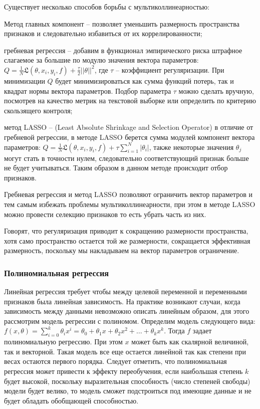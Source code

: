 Существует несколько способов борьбы с мультиколлинеарностью: 
\begin{description}[font=$\bullet$]
    \item Метод главных компонент -- позволяет уменьшить размерность пространства признаков и следовательно избавиться от их коррелированности;
    \item гребневая регрессия -- добавим в функционал эмпирического риска штрафное слагаемое за большие по модулю значения вектора параметров: $Q = \frac{1}{N} \mathfrak{L}(\theta,x_i,y_i,f) + \frac{\tau}{2}|| \theta ||^2$, где $\tau$ -- коэффициент регуляризации. При минимизации $Q$ будет минимизироваться как сумма функций потерь, так и квадрат нормы вектора параметров. Подбор параметра $\tau$ можно сделать вручную, посмотрев на качество метрик на текстовой выборке или определить по критерию скользящего контроля;
    \item метод LASSO -- (Least Absolute Shrinkage and Selection Operator) в отличие от гребневой регрессии, в методе LASSO берется сумма модулей компонент вектора параметров: $Q = \frac{1}{N} \mathfrak{L}(\theta,x_i,y_i,f) + \tau\sum\limits_{i=1}^N |\theta_i|$, также некоторые значения $\theta_j$ могут стать в точности нулем, следовательно соответствующий признак больше не будет учитываться. Таким образом в данном методе происходит отбор признаков.
\end{description}

Гребневая регрессия и метод LASSO позволяют ограничить вектор параметров и тем самым избежать проблемы мультиколлинеарности, при этом в методе LASSO можно провести селекцию признаков то есть убрать часть из них.

Говорят, что регуляризация приводит к сокращению размерности пространства, хотя само пространство остается той же размерности, сокращается эффективная размерность, поскольку мы накладываем на вектор параметров ограничение.


\subsubsection{Полиномиальная регрессия}

Линейная регрессия требует чтобы между целевой переменной и переменными признаков была линейная зависимость. На практике возникают случаи, когда зависимость между данными невозможно описать линейным образом, для этого рассмотрим модель регрессии с полиномом. Определим модель следующего вида: $f(x,\theta) = \sum\limits_{i=0}^k \theta_i x^i = \theta_0 + \theta_1 x + \theta_2 x^2 + \dots + \theta_k x^k $. Тогда $f$ задает полиномиальную регрессию. При этом $x$ может быть как скалярной величиной, так и векторной. Такая модель все еще остается линейной так как степени при весах остаются первого порядка. Следует отметить, что полиномиальная регрессия может привести к эффекту переобучения, если наибольшая степень $k$ будет высокой, поскольку выразительная способность (число степеней свободы) модели будет велико, то модель сможет подстроиться под имеющие данные и не будет обладать обобщающей способностью.


